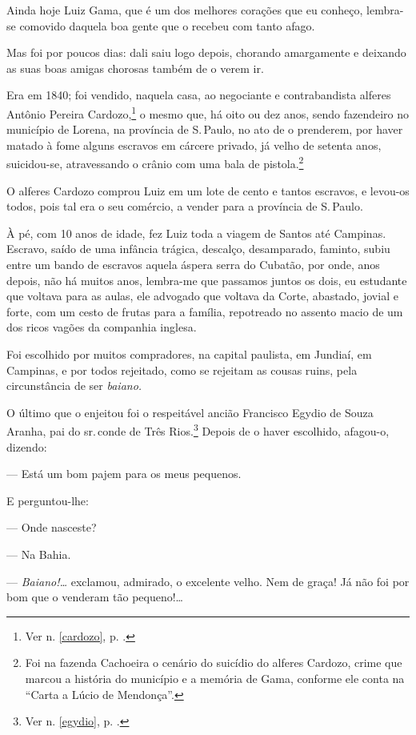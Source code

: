 Ainda hoje Luiz Gama, que é um dos melhores corações que eu conheço,
lembra-se comovido daquela boa gente que o recebeu com tanto afago.

Mas foi por poucos dias: dali saiu logo depois, chorando amargamente e
deixando as suas boas amigas chorosas também de o verem ir.

Era em 1840; foi vendido, naquela casa, ao negociante e contrabandista
alferes Antônio Pereira Cardozo,\footnote{Ver n. \ref{cardozo}, p. \pageref{cardozo}.} o mesmo que, há oito
ou dez anos, sendo fazendeiro no município de Lorena, na província de S.\,Paulo, no ato de o prenderem, por haver matado à fome alguns escravos em
cárcere privado, já velho de setenta anos, suicidou-se, atravessando o
crânio com uma bala de pistola.\footnote{Foi na fazenda Cachoeira o
  cenário do suicídio do alferes Cardozo, crime que marcou a história do
  município e a memória de Gama, conforme ele conta na ``Carta a
  Lúcio de Mendonça''.}

O alferes Cardozo comprou Luiz em um lote de cento e tantos escravos, e
levou-os todos, pois tal era o seu comércio, a vender para a província
de S.\,Paulo.

À pé, com 10 anos de idade, fez Luiz toda a viagem de Santos até
Campinas. Escravo, saído de uma infância trágica, descalço, desamparado,
faminto, subiu entre um bando de escravos aquela áspera serra do
Cubatão, por onde, anos depois, não há muitos anos, lembra-me que
passamos juntos os dois, eu estudante que voltava para as aulas, ele
advogado que voltava da Corte, abastado, jovial e forte, com um cesto de
frutas para a família, repotreado no assento macio de um dos ricos
vagões da companhia inglesa.

Foi escolhido por muitos compradores, na capital paulista, em
Jundiaí,
em Campinas, e por todos rejeitado, como se rejeitam as cousas ruins,
pela circunstância de ser \emph{baiano.}

O último que o enjeitou foi o respeitável ancião Francisco Egydio de
Souza Aranha, pai do sr.\,conde de Três Rios.\footnote{Ver n. \ref{egydio}, p. \pageref{egydio}.} Depois de o
haver escolhido, afagou-o, dizendo:

--- Está um bom pajem para os meus pequenos.

E perguntou-lhe:

--- Onde nasceste?

--- Na Bahia.

--- \emph{Baiano!\ldots{}} exclamou, admirado, o excelente velho. Nem de
graça! Já não foi por bom que o venderam tão pequeno!\ldots{}

